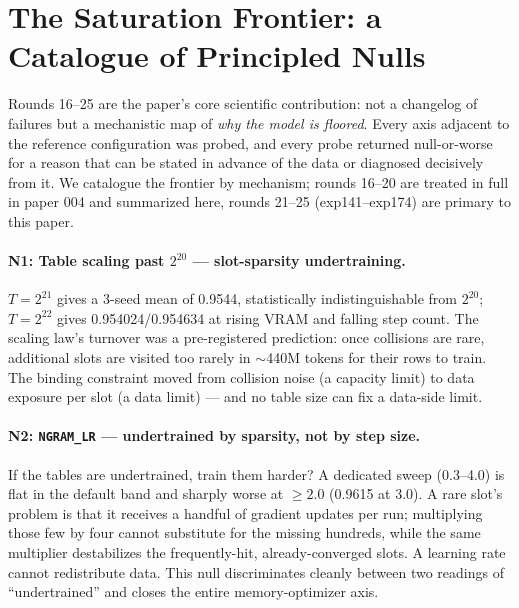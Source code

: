 \documentclass{article}
\begin{document}
\section{The Saturation Frontier: a Catalogue of Principled Nulls}
\label{sec:frontier}

Rounds 16--25 are the paper's core scientific contribution: not a changelog of failures but a mechanistic map of \emph{why the model is floored}. Every axis adjacent to the reference configuration was probed, and every probe returned null-or-worse for a reason that can be stated in advance of the data or diagnosed decisively from it. We catalogue the frontier by mechanism; rounds 16--20 are treated in full in paper 004 \cite{ophis2026paper004} and summarized here, rounds 21--25 (exp141--exp174) are primary to this paper.

\paragraph{N1: Table scaling past $2^{20}$ --- slot-sparsity undertraining.}
$T = 2^{21}$ gives a 3-seed mean of 0.9544, statistically indistinguishable from $2^{20}$; $T = 2^{22}$ gives 0.954024/0.954634 at rising VRAM and falling step count. The scaling law's turnover was a pre-registered prediction: once collisions are rare, additional slots are visited too rarely in $\sim$440M tokens for their rows to train. The binding constraint moved from collision noise (a capacity limit) to data exposure per slot (a data limit) --- and no table size can fix a data-side limit.

\paragraph{N2: \texttt{NGRAM\_LR} --- undertrained by sparsity, not by step size.}
If the tables are undertrained, train them harder? A dedicated sweep (0.3--4.0) is flat in the default band and sharply worse at $\geq 2.0$ (0.9615 at 3.0). A rare slot's problem is that it receives a handful of gradient updates per run; multiplying those few by four cannot substitute for the missing hundreds, while the same multiplier destabilizes the frequently-hit, already-converged slots. A learning rate cannot redistribute data. This null discriminates cleanly between two readings of ``undertrained'' and closes the entire memory-optimizer axis.
\end{document}
